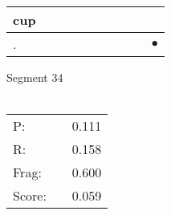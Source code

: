 \documentclass[landscape]{article}
\newcommand{\ssp}{\hspace{2pt}}
\newcommand{\mex}{\cellcolor{g}$\bullet$}
\begin{document}
\begin{tabular}{|l|p{10pt}|p{10pt}|p{10pt}|p{10pt}|p{10pt}|p{10pt}|p{10pt}|p{10pt}|p{10pt}|}
\hline
\ssp cup \ssp&\hspace{2pt}&\hspace{2pt}&\hspace{2pt}&\hspace{2pt}&\hspace{2pt}&\hspace{2pt}&\hspace{2pt}&\hspace{2pt}&\hspace{2pt}\\
\hline
\ssp \cellcolor{ref8}. \ssp&\hspace{2pt}&\hspace{2pt}&\hspace{2pt}&\hspace{2pt}&\hspace{2pt}&\hspace{2pt}&\hspace{2pt}&\hspace{2pt}&\hspace{2pt}\mex\\
\hline
\end{tabular}

\vspace{6pt}
\noindent Segment 34\\\\
\noindent\begin{tabular}{lm{12pt}r}
\hline
P:&&0.111\\
R:&&0.158\\
Frag:&&0.600\\
Score:&&0.059\\
\end{tabular}

\newpage
\end{document}
